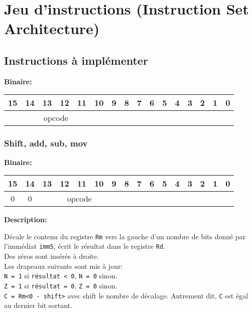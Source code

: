 \section{Jeu d'instructions (Instruction Set Architecture)}
\label{sec:ISA}

\subsection{Instructions à implémenter}

\textbf{Binaire:}\\

\begin{tabular}{| c c c c c c c c c c c c c c c c |}
\hline
15 & 14 & 13 & 12 & 11 & 10 & \multicolumn{1}{|c}{9} & 8 & 7 & 6 & 5 & 4 & 3 & 2 & 1 & 0 \\
\hline
\multicolumn{6}{|c}{opcode} & \multicolumn{10}{|c|}{} \\
\hline
\end{tabular}


\subsubsection{Shift, add, sub, mov}

\textbf{Binaire:}\\

\begin{tabular}{| c c c c c c c c c c c c c c c c |}
\hline
15 & 14 & \multicolumn{1}{|c}{13} & 12 & 11 & 10 & 9 & \multicolumn{1}{|c}{8} & 7 & 6 & 5 & 4 & 3 & 2 & 1 & 0 \\
\hline
0 & 0 & \multicolumn{5}{|c}{opcode} & \multicolumn{9}{|c|}{} \\
\hline
\end{tabular}



\textbf{Description: }

Décale le contenu du registre \texttt{Rm} vers la gauche d'un nombre de bits donné par l'immédiat \texttt{imm5}, écrit le résultat dans le registre \texttt{Rd}.\\
Des zéros sont insérés à droite.\\
Les drapeaux suivants sont mis à jour:\\
\texttt{N = 1} si \texttt{résultat < 0}, \texttt{N = 0} sinon.\\                                      
\texttt{Z = 1} si \texttt{résultat = 0}, \texttt{Z = 0} sinon.\\
\texttt{C = Rm<0 - shift>} avec shift le nombre de décalage. Autrement dit, \texttt{C} est égal au dernier bit sortant.\\

